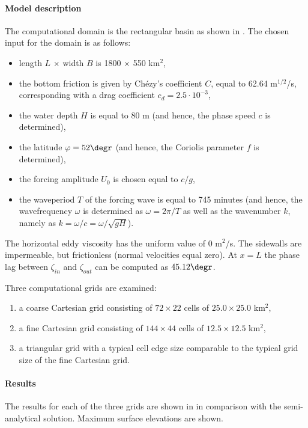 \paragraph*{Model description}
The computational domain is the rectangular basin as shown in . The chosen input for the domain is as follows:
\begin{itemize}
\item length $L$ $\times$ width $B$ is 1800 $\times$ 550 km$^2$,
\item the bottom friction is given by Ch\'ezy's coefficient $C$, equal to 62.64 m$^{1/2}$/s, corresponding with a drag coefficient $c_d = 2.5\cdot10^{-3}$,
\item the water depth $H$ is equal to 80 m (and hence, the phase speed $c$ is determined),
\item the latitude $\varphi = 52 \degr$ (and hence, the Coriolis parameter $f$ is determined),
\item the forcing amplitude $U_0$ is chosen equal to $c/g$,
\item the waveperiod $T$ of the forcing wave is equal to 745 minutes (and hence, the wavefrequency $\omega$ is determined as $\omega = 2\pi/T$ as well as the wavenumber $k$, namely as $k= \omega / c = \omega / \sqrt{gH}$).
\end{itemize}
The horizontal eddy viscosity has the uniform value of 0 m$^2$/s. The sidewalls are impermeable, but frictionless (normal velocities equal zero). At $x = L$ the phase lag between $\zeta_{in}$ and $\zeta_{out}$ can be computed as $45.12\degr$. 

Three computational grids are examined: 
\begin{enumerate}
\item a coarse Cartesian grid consisting of $72 \times 22$ cells of $25.0 \times 25.0$ km$^2$,
\item a fine Cartesian grid consisting of $144 \times 44$ cells of $12.5 \times 12.5$ km$^2$,
\item a triangular grid with a typical cell edge size comparable to the typical grid size of the fine Cartesian grid.
\end{enumerate}


\paragraph*{Results}
The results for each of the three grids are shown in  in comparison with the semi-analytical solution. Maximum surface elevations are shown.


